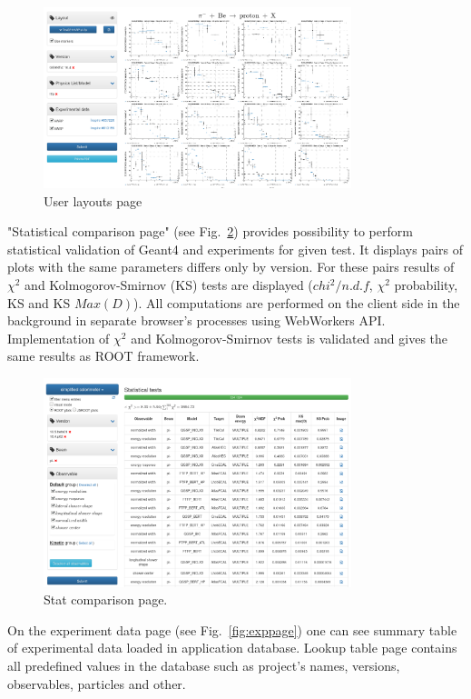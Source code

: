 \begin{figure}[h]
    \centering
    \includegraphics[width=0.8\textwidth,clip]{layouts.png}
    \caption{User layouts page}
    \label{fig:layouts}
\end{figure}

"Statistical comparison page" (see Fig.~\ref{fig:statcomparison}) provides possibility to perform statistical validation of Geant4 and experiments for given test. It displays pairs of plots with the same parameters differs only by version. For these pairs results of $\chi^2$ and Kolmogorov-Smirnov (KS) tests are displayed ($chi^2/n.d.f$, $\chi^2$ probability, KS and KS $Max(D)$). All computations are performed on the client side in the background in separate browser's processes using WebWorkers API. Implementation of $\chi^2$ and Kolmogorov-Smirnov tests is validated and gives the same results as ROOT framework.

\begin{figure}[h]
    \centering
    \includegraphics[width=0.8\textwidth,clip]{statcomparison.png}
    \caption{Stat comparison page.}
    \label{fig:statcomparison}
\end{figure}

On the experiment data page (see Fig.~\ref{fig:exppage}) one can see summary table of experimental data loaded in application database.
Lookup table page contains all predefined values in the database such as project's names, versions, observables, particles and other.

